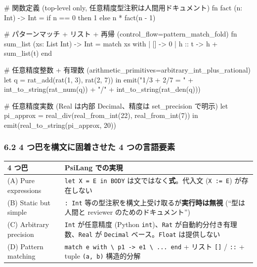\documentclass[
]{ltjsarticle}
\newenvironment{Shaded}{}{}
\newcommand{\NormalTok}[1]{#1}
\newcounter{none} %
\begin{document}
\begin{Shaded}
\begin{Highlighting}[]
\NormalTok{\# 関数定義 (top{-}level only, 任意精度型注釈は人間用ドキュメント)}
\NormalTok{fn fact (n: Int) {-}\textgreater{} Int =}
\NormalTok{  if n == 0 then 1}
\NormalTok{  else n * fact(n {-} 1)}

\NormalTok{\# パターンマッチ + リスト + 再帰 (control\_flow=pattern\_match\_fold)}
\NormalTok{fn sum\_list (xs: List Int) {-}\textgreater{} Int =}
\NormalTok{  match xs with}
\NormalTok{  | []      {-}\textgreater{} 0}
\NormalTok{  | h :: t  {-}\textgreater{} h + sum\_list(t)}
\NormalTok{  end}

\NormalTok{\# 任意精度整数 + 有理数 (arithmetic\_primitives=arbitrary\_int\_plus\_rational)}
\NormalTok{let q = rat\_add(rat(1, 3), rat(2, 7)) in}
\NormalTok{emit("1/3 + 2/7 = " + int\_to\_string(rat\_num(q))}
\NormalTok{                    + "/" + int\_to\_string(rat\_den(q)))}

\NormalTok{\# 任意精度実数 (Real は内部 Decimal、精度は set\_precision で明示)}
\NormalTok{let pi\_approx = real\_div(real\_from\_int(22), real\_from\_int(7)) in}
\NormalTok{emit(real\_to\_string(pi\_approx, 20))}
\end{Highlighting}
\end{Shaded}

\subsubsection{6.2 4 つ巴を構文に固着させた 4
つの言語要素}\label{ux3064ux5df4ux3092ux69cbux6587ux306bux56faux7740ux3055ux305bux305f-4-ux3064ux306eux8a00ux8a9eux8981ux7d20}

{\def\LTcaptype{none} %
\begin{longtable}[]{@{}
  >{\raggedright\arraybackslash}p{}
  >{\raggedright\arraybackslash}p{}@{}}
\toprule\noalign{}
\begin{minipage}[b]{\linewidth}\raggedright
4 つ巴
\end{minipage} & \begin{minipage}[b]{\linewidth}\raggedright
PsiLang での実現
\end{minipage} \\
\midrule\noalign{}
\endhead
\bottomrule\noalign{}
\endlastfoot
(A) Pure expressions & \texttt{let\ X\ =\ E\ in\ BODY}
は文ではなく\textbf{式}。代入文 (\texttt{X\ :=\ E}) が存在しない \\
(B) Static but simple & \texttt{:\ Int}
等の型注釈を構文上受け取るが\textbf{実行時は無視} (``型は人間と reviewer
のためのドキュメント'') \\
(C) Arbitrary precision & \texttt{Int} が任意精度 (Python
\texttt{int})、\texttt{Rat} が自動約分付き有理数、\texttt{Real} が
\texttt{Decimal} ベース。\texttt{Float} は提供しない \\
(D) Pattern matching &
\texttt{match\ e\ with\ \textbackslash{}\textbar{}\ p1\ -\textgreater{}\ e1\ \textbackslash{}\textbar{}\ ...\ end}
+ リスト \texttt{{[}{]}} / \texttt{::} + tuple \texttt{(a,\ b)}
構造的分解 \\
\end{longtable}
}
\end{document}
